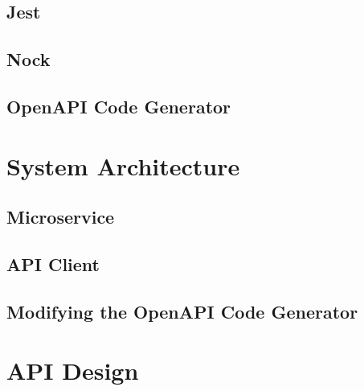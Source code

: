     \subsection{Jest}
    \subsection{Nock}
    \subsection{OpenAPI Code Generator}
\section{System Architecture}
\subsection{Microservice}
\subsection{API Client}
\subsection{Modifying the OpenAPI Code Generator}
\section{API Design}